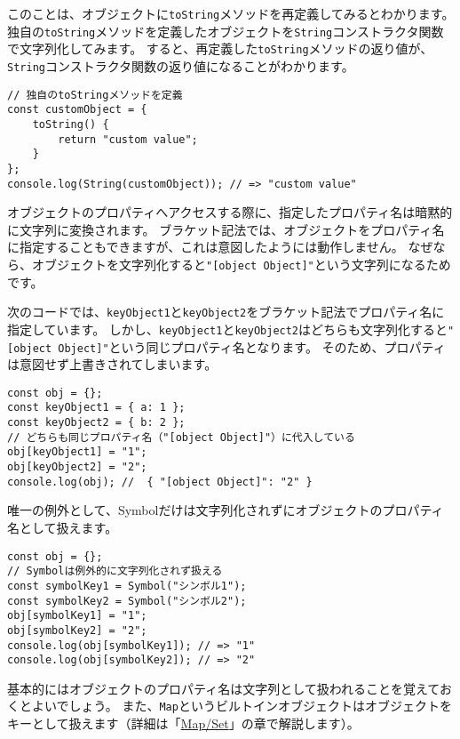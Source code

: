 このことは、オブジェクトに\texttt{toString}メソッドを再定義してみるとわかります。
独自の\texttt{toString}メソッドを定義したオブジェクトを\texttt{String}コンストラクタ関数で文字列化してみます。
すると、再定義した\texttt{toString}メソッドの返り値が、\texttt{String}コンストラクタ関数の返り値になることがわかります。

\begin{lstlisting}
// 独自のtoStringメソッドを定義
const customObject = {
    toString() {
        return "custom value";
    }
};
console.log(String(customObject)); // => "custom value"
\end{lstlisting}

\begin{tcolorbox}[enhanced jigsaw,breakable,title=オブジェクトのプロパティ名は文字列化される]\label{object-property-is-to-string}

オブジェクトのプロパティへアクセスする際に、指定したプロパティ名は暗黙的に文字列に変換されます。
ブラケット記法では、オブジェクトをプロパティ名に指定することもできますが、これは意図したようには動作しません。
なぜなら、オブジェクトを文字列化すると\texttt{"[object Object]"}という文字列になるためです。

次のコードでは、\texttt{keyObject1}と\texttt{keyObject2}をブラケット記法でプロパティ名に指定しています。
しかし、\texttt{keyObject1}と\texttt{keyObject2}はどちらも文字列化すると\texttt{"[object Object]"}という同じプロパティ名となります。
そのため、プロパティは意図せず上書きされてしまいます。

\begin{lstlisting}
const obj = {};
const keyObject1 = { a: 1 };
const keyObject2 = { b: 2 };
// どちらも同じプロパティ名（"[object Object]"）に代入している
obj[keyObject1] = "1";
obj[keyObject2] = "2";
console.log(obj); //  { "[object Object]": "2" }
\end{lstlisting}

唯一の例外として、Symbolだけは文字列化されずにオブジェクトのプロパティ名として扱えます。

\begin{lstlisting}
const obj = {};
// Symbolは例外的に文字列化されず扱える
const symbolKey1 = Symbol("シンボル1");
const symbolKey2 = Symbol("シンボル2");
obj[symbolKey1] = "1";
obj[symbolKey2] = "2";
console.log(obj[symbolKey1]); // => "1"
console.log(obj[symbolKey2]); // => "2"
\end{lstlisting}

基本的にはオブジェクトのプロパティ名は文字列として扱われることを覚えておくとよいでしょう。
また、\texttt{Map}というビルトインオブジェクトはオブジェクトをキーとして扱えます（詳細は「\hyperlink{map-and-set}{Map/Set}」の章で解説します）。
\end{tcolorbox}

